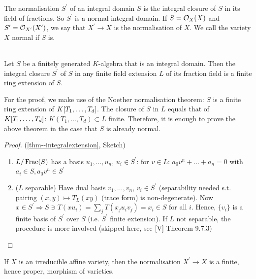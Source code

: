 \documentclass[a4paper,11pt]{article}
\begin{document}
			\begin{defi}
				The normalisation $S^\prime$ of an integral domain $S$ is the integral closure of $S$ in its field of fractions. So $S^\prime $ is a normal integral domain. If $S=\mathcal{O}_X(X)$ and $S^\prime=\mathcal{O}_{X^\prime}(X^{\prime})$, we say that $X^{\prime}\rightarrow X$ is the normalisation of $X$. We call the variety $X$ normal if $S$ is.
			\end{defi}

			\begin{thm}\label{thm--integralextension}
				\phantom{k}\\ Let $S$ be a finitely generated $K$-algebra that is an integral domain. Then the integral closure $S^\prime$ of $S$ in any finite field extension $L$ of its fraction field is a finite ring extension of $S$.
			\end{thm}

			For the proof, we make use of the Noether normalisation theorem: $S$ is a finite ring extension of $K[T_1,\dots,T_{d}]$. The closure of $S$ in $L$ equals that of $K[T_1,\dots,T_{d}]$: $K(T_1,\dots,T_d)\subset L$ finite. Therefore, it is enough to prove the above theorem in the case that $S$ is already normal.

			\begin{proof}
				(\autoref{thm--integralextension}, Sketch)
				\begin{enumerate}
					\item $L/\operatorname{Frac}(S)$ has a basis $u_1,\dots,u_n$, $u_i\in S^\prime$: for $v\in L$: $a_0v^n+\dots +a_n=0$ with $a_i\in S, a_0v^n\in S^\prime$
					\item ($L$ separable) Have dual basis $v_1,\dots,v_n$, $v_i\in S^\prime$ (separability needed s.t. pairing $(x,y)\mapsto T_{L}(xy)$ (trace form) is non-degenerate). Now $x\in S^\prime\Longrightarrow S\ni T(x u_i)=\sum_jT(x_ju_iv_j)=x_i\in S$ for all $i$. Hence, $\{v_i\}$ is a finite basis of $S^\prime$ over $S$ (i.e. $S^\prime$ finite extension). If $L$ not separable, the procedure is more involved (skipped here, see [V] Theorem 9.7.3)
				\end{enumerate}
			\end{proof}

			\begin{cor}
				If $X$ is an irreducible affine variety, then the normalisation $X^\prime\rightarrow X$ is a finite, hence proper, morphism of varieties.
			\end{cor}
\end{document}
